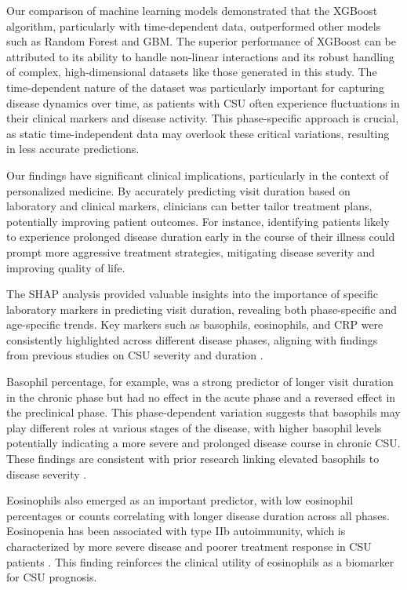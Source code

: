 \documentclass[final,3p,times,authoryear]{elsarticle}
\begin{document}
Our comparison of machine learning models demonstrated that the XGBoost algorithm, particularly with time-dependent data, outperformed other models such as Random Forest and GBM. The superior performance of XGBoost can be attributed to its ability to handle non-linear interactions and its robust handling of complex, high-dimensional datasets like those generated in this study. The time-dependent nature of the dataset was particularly important for capturing disease dynamics over time, as patients with CSU often experience fluctuations in their clinical markers and disease activity. This phase-specific approach is crucial, as static time-independent data may overlook these critical variations, resulting in less accurate predictions.

Our findings have significant clinical implications, particularly in the context of personalized medicine. By accurately predicting visit duration based on laboratory and clinical markers, clinicians can better tailor treatment plans, potentially improving patient outcomes. For instance, identifying patients likely to experience prolonged disease duration early in the course of their illness could prompt more aggressive treatment strategies, mitigating disease severity and improving quality of life.

The SHAP analysis provided valuable insights into the importance of specific laboratory markers in predicting visit duration, revealing both phase-specific and age-specific trends. Key markers such as basophils, eosinophils, and CRP were consistently highlighted across different disease phases, aligning with findings from previous studies on CSU severity and duration \citep{SanchezBorges2017Factors, Kolkhir2019Eosinopenia}.

Basophil percentage, for example, was a strong predictor of longer visit duration in the chronic phase but had no effect in the acute phase and a reversed effect in the preclinical phase. This phase-dependent variation suggests that basophils may play different roles at various stages of the disease, with higher basophil levels potentially indicating a more severe and prolonged disease course in chronic CSU. These findings are consistent with prior research linking elevated basophils to disease severity \citep{SanchezBorges2017Factors}.

Eosinophils also emerged as an important predictor, with low eosinophil percentages or counts correlating with longer disease duration across all phases. Eosinopenia has been associated with type IIb autoimmunity, which is characterized by more severe disease and poorer treatment response in CSU patients \citep{Kolkhir2019Eosinopenia}. This finding reinforces the clinical utility of eosinophils as a biomarker for CSU prognosis.
\end{document}
